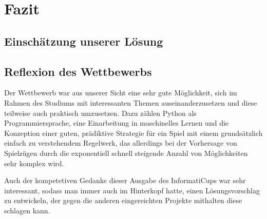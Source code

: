 \chapter{Fazit}
\label{ch:fazit}

\section{Einschätzung unserer Lösung}
\label{sec:einschaetzuung}

\section{Reflexion des Wettbewerbs}
\label{sec:reflexion}

Der Wettbewerb war aus unserer Sicht eine sehr gute Möglichkeit, sich im Rahmen des Studiums mit interessanten Themen
auseinanderzusetzen und diese teilweise auch praktisch umzusetzen.
Dazu zählen \ua Python als Programmiersprache, eine Einarbeitung in maschinelles Lernen und die Konzeption einer
guten, prädiktive Strategie für ein Spiel mit einem grundsätzlich einfach zu verstehendem Regelwerk, das allerdings
bei der Vorhersage von Spielzügen durch die exponentiell schnell steigende Anzahl von Möglichkeiten sehr komplex wird.

Auch der kompetetiven Gedanke dieser Ausgabe des InformatiCups war sehr interessant, sodass man immer auch im
Hinterkopf hatte, einen Lösungsvorschlag zu entwickeln, der gegen die anderen eingereichten Projekte mithalten \bzw
diese schlagen kann.